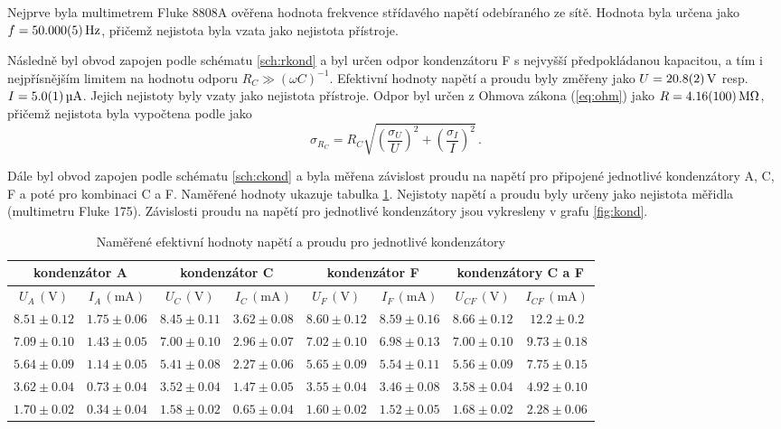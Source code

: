 \documentclass{../concepts/prepareprotokol} %
\newcommand{\relative}[1]{
\left( \frac{\sigma_{#1}}{#1} \right)^2
}
\begin{document}
Nejprve byla multimetrem Fluke 8808A ověřena hodnota frekvence střídavého napětí odebíraného ze sítě. Hodnota byla určena jako $f = \qty{50.000 \pm 0.005}{Hz}$, přičemž nejistota byla vzata jako nejistota přístroje.

Následně byl obvod zapojen podle schématu \ref{sch:rkond} a byl určen odpor kondenzátoru F s nejvyšší předpokládanou kapacitou, a tím i nejpřísnějším limitem na hodnotu odporu $R_C \gg (\omega C)^{-1}$. Efektivní hodnoty napětí a proudu byly změřeny jako $U= \qty{20.8\pm0.2}{V}$ resp. $I=\qty{5.0\pm0.1}{\micro\ampere}$. Jejich nejistoty byly vzaty jako nejistota přístroje. Odpor byl určen z Ohmova zákona (\ref{eq:ohm}) jako $R = \qty{4.16\pm1.0}{\mega\ohm}$, přičemž nejistota byla vypočtena podle \cite{englich} jako
\begin{equation}
    \sigma_{R_C} = R_C \sqrt{\relative{U} + \relative{I}} \, .
\end{equation}

Dále byl obvod zapojen podle schématu \ref{sch:ckond} a byla měřena závislost proudu na napětí pro připojené jednotlivé kondenzátory A, C, F a poté pro kombinaci C a F. Naměřené hodnoty ukazuje tabulka \ref{tab:kond}. Nejistoty napětí a proudu byly určeny jako nejistota měřidla (multimetru Fluke 175). Závislosti proudu na napětí pro jednotlivé kondenzátory jsou vykresleny v grafu \ref{fig:kond}. 

\begin{table}[!htbp]
\centering
\caption{Naměřené efektivní hodnoty napětí a proudu pro jednotlivé kondenzátory}
\begin{tabular}{cc|cc|cc|cc}
 \toprule
 \multicolumn{2}{c|}{kondenzátor A} & \multicolumn{2}{c|}{kondenzátor C} & \multicolumn{2}{c|}{kondenzátor F} & \multicolumn{2}{c}{kondenzátory C a F} \\
 \midrule
 $U_A\, (\mathrm{V})$ & $I_A\, (\mathrm{mA})$ & $U_C\, (\mathrm{V})$ & $I_C\, (\mathrm{mA})$ & $U_F\, (\mathrm{V})$ & $I_F\, (\mathrm{mA})$ & $U_{CF}\, (\mathrm{V})$ & $I_{CF}\, (\mathrm{mA})$ \\
 \midrule
 $8.51 \pm 0.12$ & $1.75 \pm 0.06$ & $8.45 \pm 0.11$ & $3.62 \pm 0.08$ & $8.60 \pm 0.12$ & $8.59 \pm 0.16$ & $8.66 \pm 0.12$ & $12.2 \pm 0.2$ \\
 $7.09 \pm 0.10$ & $1.43 \pm 0.05$ & $7.00 \pm 0.10$ & $2.96 \pm 0.07$ & $7.02 \pm 0.10$ & $6.98 \pm 0.13$ & $7.00 \pm 0.10$ & $9.73 \pm 0.18$ \\  
 $5.64 \pm 0.09$ & $1.14 \pm 0.05$ & $5.41 \pm 0.08$ & $2.27 \pm 0.06$ & $5.65 \pm 0.09$ & $5.54 \pm 0.11$ & $5.56 \pm 0.09$ & $7.75 \pm 0.15$ \\
 $3.62 \pm 0.04$ & $0.73 \pm 0.04$ & $3.52 \pm 0.04$ & $1.47 \pm 0.05$ & $3.55 \pm 0.04$ & $3.46 \pm 0.08$ & $3.58 \pm 0.04$ & $4.92 \pm 0.10$ \\
 $1.70 \pm 0.02$ & $0.34 \pm 0.04$ & $1.58 \pm 0.02$ & $0.65 \pm 0.04$ & $1.60 \pm 0.02$ & $1.52 \pm 0.05$ & $1.68 \pm 0.02$ & $2.28 \pm 0.06$ \\
 \bottomrule
\end{tabular}
\label{tab:kond}
\end{table}
\end{document}
